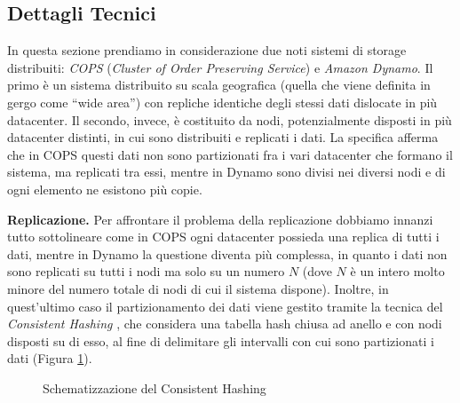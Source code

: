 \documentclass[twoside]{article}
\begin{document}
\begin{multicols}{2}
\section{Dettagli Tecnici}
\label{sec:dettagli-tecnici}
In questa sezione prendiamo in considerazione due noti sistemi di storage distribuiti: \emph{COPS} (\emph{Cluster of Order Preserving Service})\cite{bib:COPS} e \emph{Amazon Dynamo}\cite{bib:dynamo}. Il primo è un sistema distribuito su scala geografica (quella che viene definita in gergo come “wide area”) con repliche identiche degli stessi dati dislocate in più datacenter. Il secondo, invece, è costituito da nodi, potenzialmente disposti in più datacenter distinti, in cui sono distribuiti e replicati i dati. La specifica afferma che in COPS questi dati non sono partizionati fra i vari datacenter che formano il sistema, ma replicati tra essi, mentre in Dynamo sono divisi nei diversi nodi e di ogni elemento ne esistono più copie.

\textbf{Replicazione.} Per affrontare il problema della replicazione dobbiamo innanzi tutto sottolineare come in COPS ogni datacenter possieda una replica di tutti i dati, mentre in Dynamo la questione diventa più complessa, in quanto i dati non sono replicati su tutti i nodi ma solo su un numero $N$ (dove $N$ è un intero molto minore del numero totale di nodi di cui il sistema dispone). Inoltre, in quest'ultimo caso il partizionamento dei dati viene gestito tramite la tecnica del \emph{Consistent Hashing} \cite{bib:hashing}, che considera una tabella hash chiusa ad anello e con nodi disposti su di esso, al fine di delimitare gli intervalli con cui sono partizionati i dati (Figura \ref{fig:consistent-hashing-ring}).
\begin{figure}[H]
\centering
{}
\caption{Schematizzazione del Consistent Hashing}
\label{fig:consistent-hashing-ring}
\end{figure}


\end{multicols}
\end{document}
